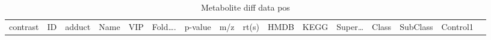 \documentclass[
]{article}
\begin{document}
\begin{longtable}[]{@{}llllllllllllllll@{}}
\caption{\label{tab:metabolite-diff-data-pos}Metabolite diff data pos}\tabularnewline
\toprule
\begin{minipage}[b]{0.04\columnwidth}\raggedright
contrast\strut
\end{minipage} & \begin{minipage}[b]{0.04\columnwidth}\raggedright
ID\strut
\end{minipage} & \begin{minipage}[b]{0.04\columnwidth}\raggedright
adduct\strut
\end{minipage} & \begin{minipage}[b]{0.04\columnwidth}\raggedright
Name\strut
\end{minipage} & \begin{minipage}[b]{0.04\columnwidth}\raggedright
VIP\strut
\end{minipage} & \begin{minipage}[b]{0.04\columnwidth}\raggedright
Fold\ldots.\strut
\end{minipage} & \begin{minipage}[b]{0.04\columnwidth}\raggedright
p-value\strut
\end{minipage} & \begin{minipage}[b]{0.04\columnwidth}\raggedright
m/z\strut
\end{minipage} & \begin{minipage}[b]{0.04\columnwidth}\raggedright
rt(s)\strut
\end{minipage} & \begin{minipage}[b]{0.04\columnwidth}\raggedright
HMDB\strut
\end{minipage} & \begin{minipage}[b]{0.03\columnwidth}\raggedright
KEGG\strut
\end{minipage} & \begin{minipage}[b]{0.04\columnwidth}\raggedright
Super\ldots{}\strut
\end{minipage} & \begin{minipage}[b]{0.04\columnwidth}\raggedright
Class\strut
\end{minipage} & \begin{minipage}[b]{0.04\columnwidth}\raggedright
SubClass\strut
\end{minipage} & \begin{minipage}[b]{0.04\columnwidth}\raggedright
Control1\strut
\end{minipage} & \begin{minipage}[b]{0.02\columnwidth}\raggedright

\end{minipage}
\end{longtable}
\end{document}
